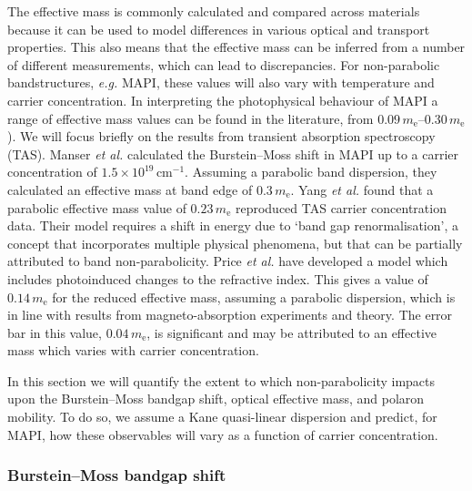 The effective mass is commonly calculated and compared across materials because it can be used to model differences in various optical and transport properties.
This also means that the effective mass can be inferred from a number of different measurements, which can lead to discrepancies.
For non-parabolic bandstructures, \textit{e.g.} MAPI, these values will also vary with temperature and carrier concentration.
In interpreting the photophysical behaviour of MAPI a range of effective mass values can be found in the literature, from $0.09\,m_{\text{e}}$--$0.30\,m_{\text{e}}$).\autocite{Miyata2015,Tanaka2003,Hirasawa1994,Yang2015,Manser2014,Price2015}
We will focus briefly on the results from transient absorption spectroscopy (TAS).
Manser \textit{et al.} calculated the Burstein--Moss shift in MAPI up to a carrier concentration of $1.5 \times 10^{19}\,\mathrm{cm}^{-1}$.\autocite{Manser2014} Assuming a parabolic band dispersion, they calculated an effective mass at band edge of $0.3\,m_{\text{e}}$.
Yang \textit{et al.} found that a parabolic effective mass value of $0.23\,m_{\text{e}}$ reproduced TAS carrier concentration data.\autocite{Yang2015} Their model requires a shift in energy due to `band gap renormalisation', a concept that incorporates multiple physical phenomena, but that can be partially attributed to band non-parabolicity.\autocite{Walsh2008}
Price \textit{et al.} have developed a model which includes photoinduced changes to the refractive index.\autocite{Price2015} This gives a value of $0.14\,m_{\text{e}}$ for the reduced effective mass, assuming a parabolic dispersion, which is in line with results from magneto-absorption experiments\autocite{Miyata2015,Tanaka2003,Hirasawa1994} and theory.\autocite{Brivio2014,Umari2014} 
The error bar in this value, $0.04\,m_{\text{e}}$, is significant and may be attributed to an effective mass which varies with carrier concentration.

In this section we will quantify the extent to which non-parabolicity impacts upon the Burstein--Moss bandgap shift, optical effective mass, and polaron mobility.
To do so, we assume a Kane quasi-linear dispersion and predict, for MAPI, how these observables will vary as a function of carrier concentration.

\subsubsection{Burstein--Moss bandgap shift}

